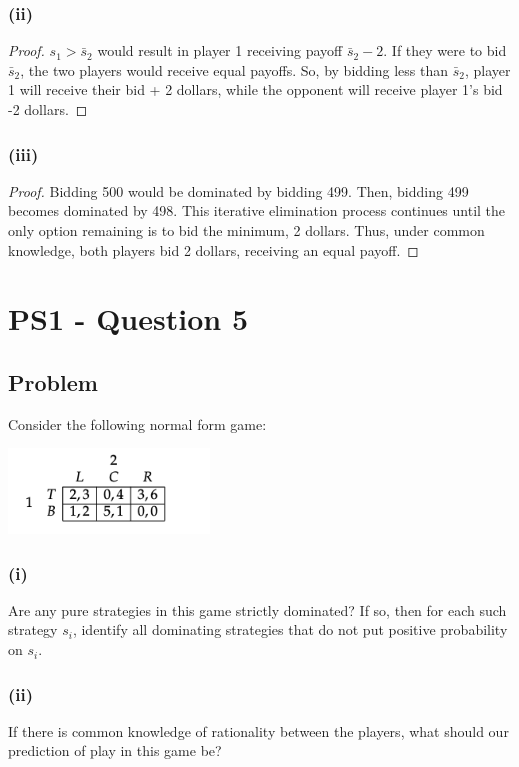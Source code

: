 \documentclass[10pt, a4paper]{article}
\begin{document}
    \subsubsection*{(ii)}
      \begin{proof}
        $s_1 > \bar{s}_2$ would result in player 1 receiving payoff $\bar{s}_2-2$. If they were to bid $\bar{s}_2$, the two players would receive equal payoffs. So, by bidding less than $\bar{s}_2$, player 1 will receive their bid + 2 dollars, while the opponent will receive player 1's bid -2 dollars.
      \end{proof}
    \subsubsection*{(iii)}
      \begin{proof}
        Bidding 500 would be dominated by bidding 499. Then, bidding 499 becomes dominated by 498. This iterative elimination process continues until the only option remaining is to bid the minimum, 2 dollars. Thus, under common knowledge, both players bid 2 dollars, receiving an equal payoff.
      \end{proof}
\section*{PS1 - Question 5}
  \subsection*{Problem}
    Consider the following normal form game:
    \begin{center}
      \includegraphics[width = 0.4\textwidth]{PS1-5.png}
    \end{center}
    \subsubsection*{(i)}
      Are any pure strategies in this game strictly dominated? If so, then for each such strategy $s_i$, identify all dominating strategies that do not put positive probability on $s_i$.
    \subsubsection*{(ii)}
      If there is common knowledge of rationality between the players, what should our prediction of play in this game be?
\end{document}

